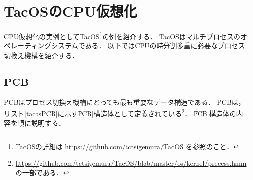 \chapter{TacOSのCPU仮想化}
\label{tacosVirtualCPU}
CPU仮想化の実例としてTacOS\footnote{TacOSの詳細は
  \url{https://github.com/tctsigemura/TacOS}
  を参照のこと．}の例を紹介する．
TacOSはマルチプロセスのオペレーティングシステムである．
以下ではCPUの時分割多重に必要なプロセス切換え機構を紹介する．

\section{PCB}
PCBはプロセス切換え機構にとっても最も重要なデータ構造である．
PCBは，リスト\ref{tacosPCB}に示す\|PCB|構造体として定義されている\footnote{
  \url{https://github.com/tctsigemura/TacOS/blob/master/os/kernel/process.hmm}
  の一部である．}．
\|PCB|構造体の内容を順に説明する．



